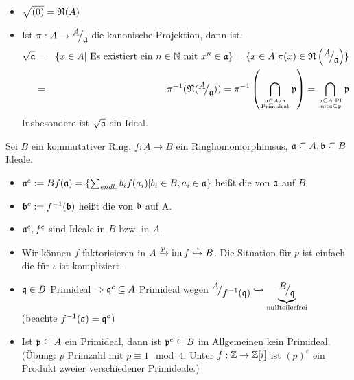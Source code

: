 \begin{anm} 
	\begin{itemize}
		\item $\sqrt{(0)} = \mathfrak{N}(A)$
		\item  Ist $\pi: A \to \QR{A}{\a} $ die kanonische Projektion, dann ist:
		\begin{eqnarray*}
			\sqrt{\a} &=& \{x \in A | \ \text{Es existiert ein } n \in \N \ \text{mit} \ x^n \in \a \} = \{x \in A| \pi(x) \in \NN\left(\QR{A}{\a}\right)\}\\
		 &=& \pi^{-1}(\NN(\QR{A}{\a}))= \pi^{-1}\left(\bigcap_{\p \subseteq A/\a \atop \text{Primideal} } \p \right) = \bigcap_{\p \subseteq A \text{ PI}\atop \text{mit} \a \subseteq \p} \p
		\end{eqnarray*}
		Insbesondere ist $\sqrt{\mathfrak{a}}$ ein Ideal.
	\end{itemize}
\end{anm}
\begin{df}
	Sei $B$ ein kommutativer Ring, $ f: A \to B $ ein Ringhomomorphimsus, $\mathfrak{a} \subseteq A, \mathfrak{b} \subseteq B $ Ideale. \\
	\begin{itemize}
		\item[] $\mathfrak{a}^e := Bf(\mathfrak{a}) = \{\sum_{endl.} b_i f(a_i)| b_i \in B, a_i \in \mathfrak{a} \} $ heißt die  von $\mathfrak{a}$ auf $B$.
		\item[] $\mathfrak{b}^c := f^{-1}(\mathfrak{b}) $ heißt die  von $\mathfrak{b}$ auf A.
	\end{itemize}
\end{df}
\begin{anm}
	\begin{itemize}
		\item $\mathfrak{a}^{e}, f^{c} $ sind Ideale in $B$ bzw. in $A$. 
		\item Wir können $f$ faktorisieren in $ A \xrightarrow{p} \operatorname{im} f \xhookrightarrow{\iota} B $. Die Situation für $p$ ist einfach die für $ \iota $ ist kompliziert. 
		\item $\mathfrak{q} \in B $ Primideal $\Rightarrow \mathfrak{q}^{c} \subseteq A $ Primideal wegen $ \QR{A}{f^{-1}(\q)} \xhookrightarrow{} \underbrace{\QR{B}{\q}}_{\text{nullteilerfrei}}$ \\(beachte $f^{-1}(\mathfrak{q}) = \mathfrak{q}^c$)
		\item Ist $ \mathfrak{p} \subseteq A $ ein Primideal, dann ist $ \mathfrak{p}^e \subseteq B$ im Allgemeinen kein Primideal. (Übung: $p$ Primzahl mit $p \equiv 1 \mod  4$. Unter $ f: \mathbb{Z} \to \mathbb{Z}[i] $ ist $(p)^e$ ein Produkt zweier verschiedener Primideale.)
	\end{itemize}
\end{anm}
